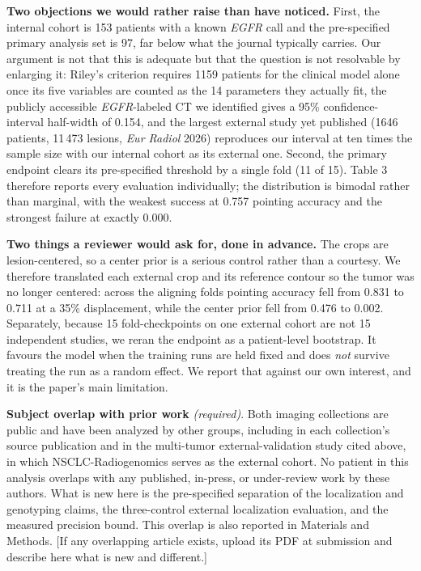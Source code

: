\documentclass[11pt]{article}
\begin{document}
\textbf{Two objections we would rather raise than have noticed.} First, the
internal cohort is 153 patients with a known \textit{EGFR} call and the
pre-specified primary analysis set is 97, far below what the journal typically
carries. Our argument is not that this is adequate but that the question is not
resolvable by enlarging it: Riley's criterion requires 1159 patients for the
clinical model alone once its five variables are counted as the 14 parameters they
actually fit, the publicly accessible \textit{EGFR}-labeled CT we identified gives
a 95\% confidence-interval half-width of 0.154, and
the largest external study yet published (1646 patients, 11\,473 lesions,
\textit{Eur Radiol} 2026) reproduces our interval at ten times the sample size
with our internal cohort as its external one. Second, the primary endpoint clears
its pre-specified threshold by a single fold (11 of 15). Table 3 therefore reports
every evaluation individually; the distribution is bimodal rather than marginal,
with the weakest success at 0.757 pointing accuracy and the strongest failure at
exactly 0.000.

\textbf{Two things a reviewer would ask for, done in advance.} The crops are
lesion-centered, so a center prior is a serious control rather than a courtesy. We
therefore translated each external crop and its reference contour so the tumor was
no longer centered: across the aligning folds pointing accuracy fell from 0.831 to
0.711 at a 35\% displacement, while the center prior fell from 0.476 to 0.002.
Separately, because 15 fold-checkpoints on one external cohort are not 15
independent studies, we reran the endpoint as a patient-level bootstrap. It
favours the model when the training runs are held fixed and does \textit{not}
survive treating the run as a random effect. We report that against our own
interest, and it is the paper's main limitation.

\medskip
\textbf{Subject overlap with prior work} \textit{(required)}. Both imaging
collections are public and have been analyzed by other groups, including in each
collection's source publication and in the multi-tumor external-validation study
cited above, in which NSCLC-Radiogenomics serves as the external cohort. No
patient in this analysis overlaps with any published, in-press, or under-review
work by these authors. What is new here is the pre-specified separation of the
localization and genotyping claims, the three-control external localization
evaluation, and the measured precision bound. This overlap is also reported in
Materials and Methods. [If any overlapping article exists, upload its PDF at
submission and describe here what is new and different.]
\end{document}
